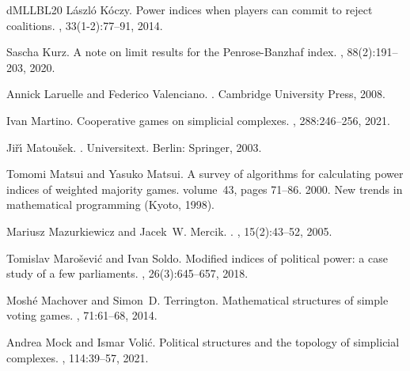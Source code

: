 \documentclass[11pt]{amsart}
\theoremstyle{plain}
\theoremstyle{definition}
\theoremstyle{remark}
\begin{document}
\begin{thebibliography}{dMLLBL20}
L{\'a}szl{\'o} K{\'o}czy.
\newblock Power indices when players can commit to reject coalitions.
, 33(1-2):77--91, 2014.

Sascha Kurz.
\newblock A note on limit results for the {Penrose}-{Banzhaf} index.
, 88(2):191--203, 2020.

Annick Laruelle and Federico Valenciano.
.
\newblock Cambridge University Press, 2008.

Ivan Martino.
\newblock Cooperative games on simplicial complexes.
, 288:246--256, 2021.

Ji{\v{r}}{\'{\i}} Matou{\v{s}}ek.
.
\newblock Universitext. Berlin: Springer, 2003.

Tomomi Matsui and Yasuko Matsui.
\newblock A survey of algorithms for calculating power indices of weighted
  majority games.
\newblock volume~43, pages 71--86. 2000.
\newblock New trends in mathematical programming (Kyoto, 1998).

Mariusz Mazurkiewicz and Jacek~W. Mercik.
.
, 15(2):43--52, 2005.

Tomislav Maro{\v{s}}evi{\'c} and Ivan Soldo.
\newblock Modified indices of political power: a case study of a few
  parliaments.
, 26(3):645--657, 2018.

Mosh\'{e} Machover and Simon~D. Terrington.
\newblock Mathematical structures of simple voting games.
, 71:61--68, 2014.

Andrea Mock and Ismar Voli{\'c}.
\newblock Political structures and the topology of simplicial complexes.
, 114:39--57, 2021.



\end{thebibliography}
\end{document}
